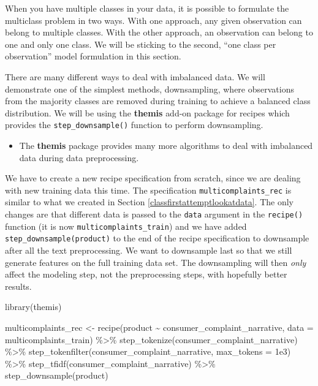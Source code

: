 \documentclass[
]{krantz}
\makeatletter
\newenvironment{Shaded}{\begin{snugshade}}{\end{snugshade}}
\newcommand{\AttributeTok}[1]{\textcolor[rgb]{0.77,0.63,0.00}{#1}}
\newcommand{\FloatTok}[1]{\textcolor[rgb]{0.00,0.00,0.81}{#1}}
\newcommand{\FunctionTok}[1]{\textcolor[rgb]{0.00,0.00,0.00}{#1}}
\newcommand{\NormalTok}[1]{#1}
\newcommand{\OtherTok}[1]{\textcolor[rgb]{0.56,0.35,0.01}{#1}}
\newcommand{\SpecialCharTok}[1]{\textcolor[rgb]{0.00,0.00,0.00}{#1}}
\newenvironment{kframe}{%
\medskip{}
\setlength{\fboxsep}{.8em}
 \def\at@end@of@kframe{}%
 \ifinner\ifhmode%
  \def\at@end@of@kframe{\end{minipage}}%
  \begin{minipage}{\columnwidth}%
 \fi\fi%
 \def\FrameCommand##1{\hskip\@totalleftmargin \hskip-\fboxsep
 \colorbox{shadecolor}{##1}\hskip-\fboxsep
     \hskip-\linewidth \hskip-\@totalleftmargin \hskip\columnwidth}%
 \MakeFramed {\advance\hsize-\width
   \@totalleftmargin\z@ \linewidth\hsize
   \@setminipage}}%
 {\par\unskip\endMakeFramed%
 \at@end@of@kframe}
\renewenvironment{Shaded}{\begin{kframe}}{\end{kframe}}
\newenvironment{rmdblock}[1]
  {\begin{shaded*}
  \begin{itemize}[left = -1cm, labelsep = 1cm]
  \renewcommand{\labelitemi}{
    \raisebox{-.7\height}[0pt][0pt]{
      {\setkeys{Gin}{width=3em,keepaspectratio}\texttt{[image: images/\#1]}}
    }
  }
 
  \item
  }
  {
  \end{itemize}
  \end{shaded*}
  }
\newenvironment{rmdpackage}
  {\begin{rmdblock}{package}}
  {\end{rmdblock}}
\makeatother
\begin{document}
When you have multiple classes in your data, it is possible to formulate the multiclass problem in two ways. With one approach, any given observation can belong to multiple classes. With the other approach, an observation can belong to one and only one class. We will be sticking to the second, ``one class per observation'' model formulation in this section.

There are many different ways to deal with imbalanced data.
We will demonstrate one of the simplest methods, downsampling, where observations from the majority classes are removed during training to achieve a balanced class distribution.
We will be using the \textbf{themis} \citep{R-themis} add-on package for recipes which provides the \texttt{step\_downsample()} function to perform downsampling.

\begin{rmdpackage}
The \textbf{themis} package provides many more algorithms to deal with
imbalanced data during data preprocessing.
\end{rmdpackage}

We have to create a new recipe specification from scratch, since we are dealing with new training data this time.
The specification \texttt{multicomplaints\_rec} is similar to what we created in Section \ref{classfirstattemptlookatdata}. The only changes are that different data is passed to the \texttt{data} argument in the \texttt{recipe()} function (it is now \texttt{multicomplaints\_train}) and we have added \texttt{step\_downsample(product)} to the end of the recipe specification to downsample after all the text preprocessing. We want to downsample last so that we still generate features on the full training data set. The downsampling will then \emph{only} affect the modeling step, not the preprocessing steps, with hopefully better results.

\begin{Shaded}
\begin{Highlighting}[]
\FunctionTok{library}\NormalTok{(themis)}

\NormalTok{multicomplaints\_rec }\OtherTok{\textless{}{-}}
  \FunctionTok{recipe}\NormalTok{(product }\SpecialCharTok{\textasciitilde{}}\NormalTok{ consumer\_complaint\_narrative,}
         \AttributeTok{data =}\NormalTok{ multicomplaints\_train) }\SpecialCharTok{\%\textgreater{}\%}
  \FunctionTok{step\_tokenize}\NormalTok{(consumer\_complaint\_narrative) }\SpecialCharTok{\%\textgreater{}\%}
  \FunctionTok{step\_tokenfilter}\NormalTok{(consumer\_complaint\_narrative, }\AttributeTok{max\_tokens =} \FloatTok{1e3}\NormalTok{) }\SpecialCharTok{\%\textgreater{}\%}
  \FunctionTok{step\_tfidf}\NormalTok{(consumer\_complaint\_narrative) }\SpecialCharTok{\%\textgreater{}\%}
  \FunctionTok{step\_downsample}\NormalTok{(product)}
\end{Highlighting}
\end{Shaded}
\end{document}
